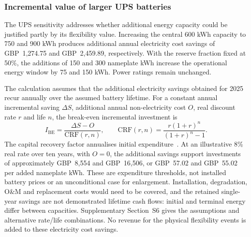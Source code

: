 \subsubsection{Incremental value of larger UPS batteries}
The UPS sensitivity addresses whether additional energy capacity could be justified partly by its flexibility value. Increasing the central 600 kWh capacity to 750 and 900 kWh produces additional annual electricity cost savings of GBP~1,274.75 and GBP~2,459.89, respectively. With the reserve fraction fixed at 50\%, the additions of 150 and 300 nameplate kWh increase the operational energy window by 75 and 150 kWh. Power ratings remain unchanged.

The calculation assumes that the additional electricity savings obtained for 2025 recur annually over the assumed battery lifetime. For a constant annual incremental saving $\Delta S$, additional annual non-electricity cost $O$, real discount rate $r$ and life $n$, the break-even incremental investment is
\begin{equation}
I_{\mathrm{BE}}=\frac{\Delta S-O}{\mathrm{CRF}(r,n)},\qquad
\mathrm{CRF}(r,n)=\frac{r(1+r)^n}{(1+r)^n-1}.
\label{eq:ups-investment}
\end{equation}
The capital recovery factor annualises initial expenditure~\cite{sam_crf}. At an illustrative 8\% real rate over ten years, with $O=0$, the additional savings support investments of approximately GBP~8,554 and GBP~16,506, or GBP~57.02 and GBP~55.02 per added nameplate kWh. These are expenditure thresholds, not installed battery prices or an unconditional case for enlargement. Installation, degradation, O\&M and replacement costs would need to be covered, and the retained single-year savings are not demonstrated lifetime cash flows: initial and terminal energy differ between capacities. Supplementary Section~S6 gives the assumptions and alternative rate/life combinations. No revenue for the physical flexibility events is added to these electricity cost savings.
